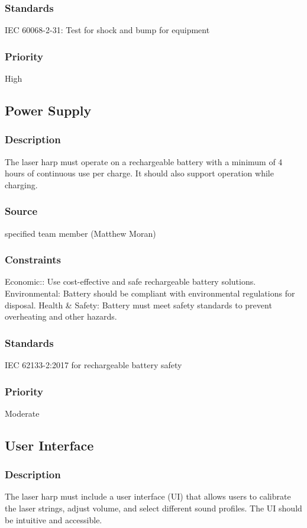 \subsubsection{Standards}
IEC 60068-2-31: Test for shock and bump for equipment
\subsubsection{Priority}
High


\subsection{Power Supply}
\subsubsection{Description}
The laser harp must operate on a rechargeable battery with a minimum of 4 hours of continuous use per charge. It should also support operation while charging.
\subsubsection{Source}
specified team member (Matthew Moran)
\subsubsection{Constraints}
Economic:: Use cost-effective and safe rechargeable battery solutions.
Environmental: Battery should be compliant with environmental regulations for disposal.
Health & Safety: Battery must meet safety standards to prevent overheating and other hazards.
\subsubsection{Standards}
IEC 62133-2:2017 for rechargeable battery safety
\subsubsection{Priority}
Moderate


\subsection{User Interface}
\subsubsection{Description}
The laser harp must include a user interface (UI) that allows users to calibrate the laser strings, adjust volume, and select different sound profiles. The UI should be intuitive and accessible.

